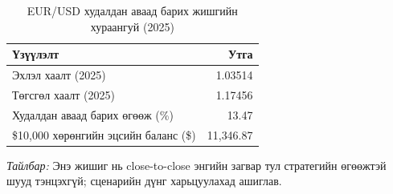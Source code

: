 \begin{table}[H]
\centering
\caption{EUR/USD худалдан аваад барих жишгийн хураангуй (2025)}
\label{tab:benchmark_buy_hold}
\footnotesize
\setlength{\tabcolsep}{4pt}
\renewcommand{\arraystretch}{1.10}
\begin{tabular}{|l|r|}
\hline
\textbf{Үзүүлэлт} & \textbf{Утга} \\ \hline
Эхлэл хаалт (2025) & 1.03514 \\ \hline
Төгсгөл хаалт (2025) & 1.17456 \\ \hline
Худалдан аваад барих өгөөж (\%) & 13.47 \\ \hline
\$10{,}000 хөрөнгийн эцсийн баланс (\$) & 11{,}346.87 \\ \hline
\end{tabular}
\end{table}

\noindent\textit{Тайлбар:} Энэ жишиг нь close-to-close энгийн загвар тул стратегийн өгөөжтэй шууд тэнцэхгүй; сценарийн дүнг харьцуулахад ашиглав.

